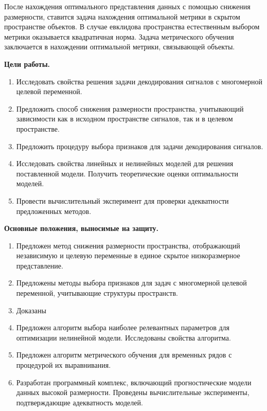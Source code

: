 После нахождения оптимального представления данных с помощью снижения размерности, ставится задача нахождения оптимальной метрики в скрытом пространстве объектов.
В случае евклидова пространства естественным выбором метрики оказывается квадратичная норма.
Задача метрического обучения заключается в нахождении оптимальной метрики, связывающей объекты.

\vspace{0.5cm}
\textbf{Цели работы.}
\begin{enumerate}
	\item Исследовать свойства решения задачи декодирования сигналов с многомерной целевой переменной.
	\item Предложить способ снижения размерности пространства, учитывающий зависимости как в исходном пространстве сигналов, так и в целевом пространстве.
	\item Предложить процедуру выбора признаков для задачи декодирования сигналов.
	\item Исследовать свойства линейных и нелинейных моделей для решения поставленной модели. Получить теоретические оценки оптимальности моделей.
	\item Провести вычислительный эксперимент для проверки адекватности предложенных методов.
\end{enumerate}


\vspace{0.5cm}
\textbf{Основные положения, выносимые на защиту.}
\begin{enumerate}
	\item Предложен метод снижения размерности пространства, отображающий независимую и целевую переменные в единое скрытое низкоразмерное представление.
	\item Предложены методы выбора признаков для задач с многомерной целевой переменной, учитывающие структуры пространств.
	\item {\color{red} Доказаны}
	\item Предложен алгоритм выбора наиболее релевантных параметров для оптимизации нелинейной модели. Исследованы свойства алгоритма.
	\item Предложен алгоритм метрического обучения для временных рядов с процедурой их выравнивания.
	\item Разработан программный комплекс, включающий прогностические модели данных высокой размерности. Проведены вычислительные эксперименты, подтверждающие адекватность моделей.
\end{enumerate}

